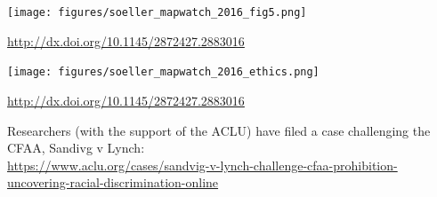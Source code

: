 \documentclass{beamer}
\begin{document}
%
%
%
\begin{frame}

\begin{center}
\texttt{[image: figures/soeller\_mapwatch\_2016\_fig5.png]}
\end{center}

\vfill
\url{http://dx.doi.org/10.1145/2872427.2883016}
\end{frame}
\begin{frame}

\begin{center}
\texttt{[image: figures/soeller\_mapwatch\_2016\_ethics.png]}
\end{center}

\vfill
\url{http://dx.doi.org/10.1145/2872427.2883016}
\end{frame}
\begin{frame}

Researchers (with the support of the ACLU) have filed a case challenging the CFAA, Sandivg v Lynch:\\
\tiny{\textcolor{blue}{\url{https://www.aclu.org/cases/sandvig-v-lynch-challenge-cfaa-prohibition-uncovering-racial-discrimination-online}}}

\end{frame}
\end{document}
